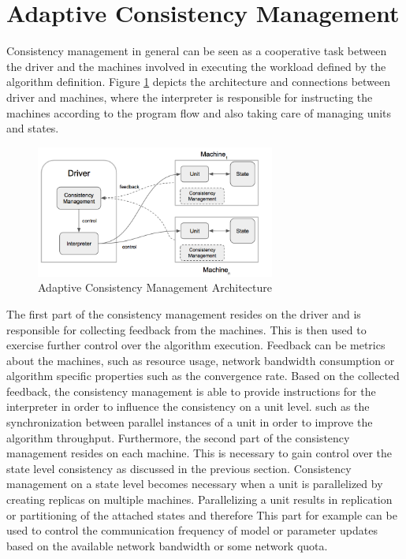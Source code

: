 \section{Adaptive Consistency Management}
Consistency management in general can be seen as a cooperative task between the driver and the machines involved in executing the workload defined by the algorithm definition.
Figure \ref{fig:adapt_consist_mgmt} depicts the architecture and connections between driver and machines, where the interpreter is responsible for instructing the machines according to the program flow and also taking care of managing units and states.
\begin{figure}[ht]
\centering
\includegraphics[width=0.7\textwidth]{img/adapt_consist_mgmt.png}
\caption{Adaptive Consistency Management Architecture}
\label{fig:adapt_consist_mgmt}
\end{figure}
The first part of the consistency management resides on the driver and is responsible for collecting feedback from the machines.
This is then used to exercise further control over the algorithm execution.
Feedback can be metrics about the machines, such as resource usage, network bandwidth consumption or algorithm specific properties such as the convergence rate.
Based on the collected feedback, the consistency management is able to provide instructions for the interpreter in order to influence the consistency on a unit level.
such as the synchronization between parallel instances of a unit in order to improve the algorithm throughput.
Furthermore, the second part of the consistency management resides on each machine.
This is necessary to gain control over the state level consistency as discussed in the previous section.
Consistency management on a state level becomes necessary when a unit is parallelized by creating replicas on multiple machines.
Parallelizing a unit results in replication or partitioning of the attached states and therefore
This part for example can be used to control the communication frequency of model or parameter updates based on the available network bandwidth or some network quota.

